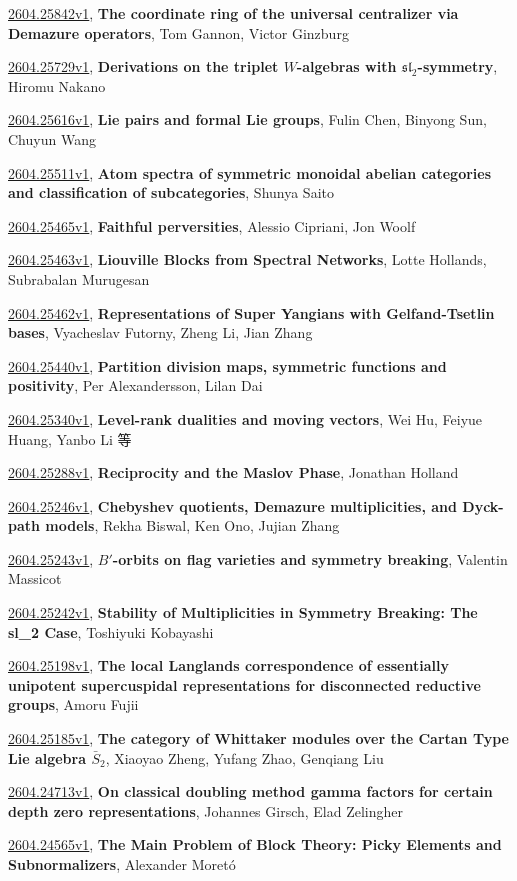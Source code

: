 \documentclass[9pt, a4paper]{article}
\theoremstyle{plain}
\theoremstyle{definition}
\theoremstyle{remark}
\newcommand{\arxiv}[3]{\href{https://arxiv.org/abs/#1}{#1}, \textbf{\textcolor{arxivblue}{#2}}, #3}
\begin{document}
\arxiv{2604.25842v1}{The coordinate ring of the universal centralizer via Demazure operators}{Tom Gannon, Victor Ginzburg}

\arxiv{2604.25729v1}{Derivations on the triplet $W$-algebras with $\mathfrak{sl}_2$-symmetry}{Hiromu Nakano}

\arxiv{2604.25616v1}{Lie pairs and formal Lie groups}{Fulin Chen, Binyong Sun, Chuyun Wang}

\arxiv{2604.25511v1}{Atom spectra of symmetric monoidal abelian categories and classification of subcategories}{Shunya Saito}

\arxiv{2604.25465v1}{Faithful perversities}{Alessio Cipriani, Jon Woolf}

\arxiv{2604.25463v1}{Liouville Blocks from Spectral Networks}{Lotte Hollands, Subrabalan Murugesan}

\arxiv{2604.25462v1}{Representations of Super Yangians with Gelfand-Tsetlin bases}{Vyacheslav Futorny, Zheng Li, Jian Zhang}

\arxiv{2604.25440v1}{Partition division maps, symmetric functions and positivity}{Per Alexandersson, Lilan Dai}

\arxiv{2604.25340v1}{Level-rank dualities and moving vectors}{Wei Hu, Feiyue Huang, Yanbo Li 等}

\arxiv{2604.25288v1}{Reciprocity and the Maslov Phase}{Jonathan Holland}

\arxiv{2604.25246v1}{Chebyshev quotients, Demazure multiplicities, and Dyck-path models}{Rekha Biswal, Ken Ono, Jujian Zhang}

\arxiv{2604.25243v1}{$B'$-orbits on flag varieties and symmetry breaking}{Valentin Massicot}

\arxiv{2604.25242v1}{Stability of Multiplicities in Symmetry Breaking: The sl_2 Case}{Toshiyuki Kobayashi}

\arxiv{2604.25198v1}{The local Langlands correspondence of essentially unipotent supercuspidal representations for disconnected reductive groups}{Amoru Fujii}

\arxiv{2604.25185v1}{The category of Whittaker modules over the Cartan Type Lie algebra $\bar{S}_2$}{Xiaoyao Zheng, Yufang Zhao, Genqiang Liu}

\arxiv{2604.24713v1}{On classical doubling method gamma factors for certain depth zero representations}{Johannes Girsch, Elad Zelingher}

\arxiv{2604.24565v1}{The Main Problem of Block Theory: Picky Elements and Subnormalizers}{Alexander Moretó}
\end{document}
